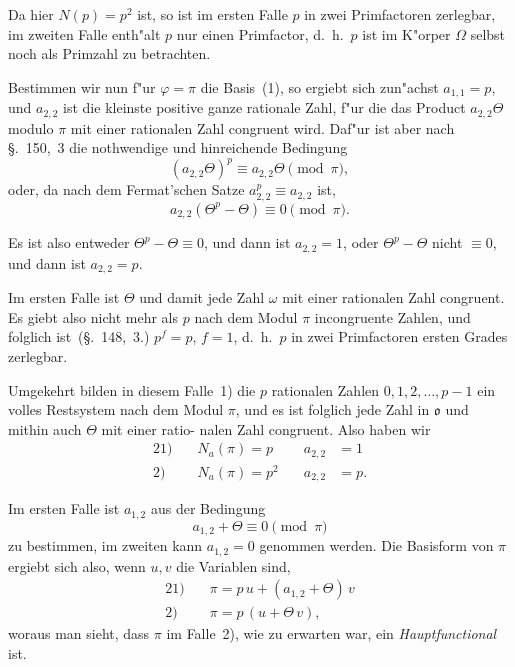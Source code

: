 \documentclass[12pt,a4paper]{article}
\theoremstyle{weber}
\begin{document}
Da hier $N(p) = p^2$ ist, so ist im ersten Falle $p$ in zwei
Primfactoren zerlegbar, im zweiten Falle enth"alt $p$ nur einen
Primfactor, d.~h.\ $p$ ist im K"orper $\varOmega$ selbst noch als Primzahl zu
betrachten.

Bestimmen wir nun f"ur $\varphi = \pi$ die Basis~(1), so ergiebt
sich zun"achst $a_{1,1} = p$, und $a_{2,2}$ ist die kleinste positive ganze
rationale Zahl, f"ur die das Product $a_{2,2}\varTheta$ modulo $\pi$ mit einer
rationalen Zahl congruent wird. Daf"ur ist aber nach \S.~150,~3
die nothwendige und hinreichende Bedingung
\[
(a_{2,2}\varTheta)^p \equiv a_{2,2}\varTheta \pmod{\pi},
\]
oder, da nach dem Fermat'schen Satze $a_{2,2}^p \equiv a_{2,2}$ ist,
\begin{equation}\label{eq:s165-2}
a_{2,2}(\varTheta^p - \varTheta) \equiv 0 \pmod{\pi}.
\end{equation}

Es ist also entweder $\varTheta^p - \varTheta \equiv 0$, und dann ist $a_{2,2} = 1$,
oder $\varTheta^p - \varTheta$ nicht $\equiv 0$, und dann ist $a_{2,2} = p$.

Im ersten Falle ist $\varTheta$ und damit jede Zahl $\omega$ mit einer
rationalen Zahl congruent. Es giebt also nicht mehr als $p$ nach
dem Modul $\pi$ incongruente Zahlen, und folglich ist~(\S.~148,~3.)
$p^f = p$, $f = 1$, d.~h.\ $p$ in zwei Primfactoren ersten Grades
zerlegbar.

\newpage

Umgekehrt bilden in diesem Falle~1) die $p$ rationalen Zahlen
$0, 1, 2, \dots, p-1$ ein volles Restsystem nach dem Modul $\pi$, und
es ist folglich jede Zahl in $\mathfrak{o}$ und mithin auch $\varTheta$ mit einer ratio-
nalen Zahl congruent. Also haben wir
\begin{alignat*}{2}
\text{1)}\quad & N_a(\pi) = p & \quad a_{2,2} &= 1 \\
\text{2)}\quad & N_a(\pi) = p^2 & \quad a_{2,2} &= p.
\end{alignat*}

Im ersten Falle ist $a_{1,2}$ aus der Bedingung
\begin{equation}\label{eq:s165-3}
a_{1,2} + \varTheta \equiv 0 \pmod{\pi}
\end{equation}
zu bestimmen, im zweiten kann $a_{1,2} = 0$ genommen werden. Die
Basisform von $\pi$ ergiebt sich also, wenn $u, v$ die Variablen sind,
\begin{alignat*}{2}
\text{1)}\quad & \pi = p\,u + (a_{1,2} + \varTheta)\,v \\
\text{2)}\quad & \pi = p\,(u + \varTheta\,v),
\end{alignat*}
woraus man sieht, dass $\pi$ im Falle~2), wie zu erwarten war, ein
\emph{Hauptfunctional} ist.
\end{document}
